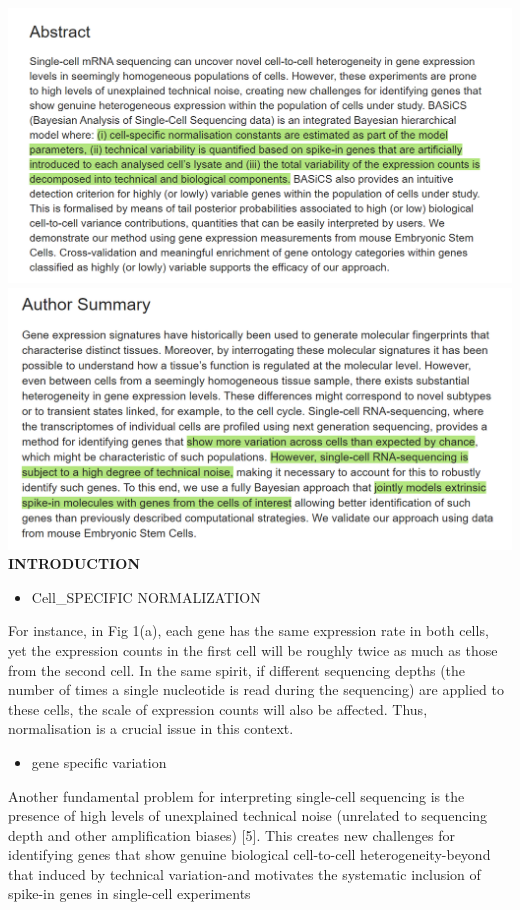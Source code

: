 \documentclass[
]{book}
\providecommand{\tightlist}{%
  \setlength{\itemsep}{0pt}\setlength{\parskip}{0pt}}
\begin{document}
\includegraphics{./figs/RNAseqCounts/BASICS.png}
\includegraphics{./figs/RNAseqCounts/BASICS2.png}
\textbf{INTRODUCTION}

\begin{itemize}
\tightlist
\item
  Cell\_SPECIFIC NORMALIZATION
\end{itemize}

For instance, in Fig 1(a), each gene has the same expression rate in both cells, yet the expression counts in the first cell will be roughly twice as much as those from the second cell. In the same spirit, if different sequencing depths (the number of times a single nucleotide is read during the sequencing) are applied to these cells, the scale of expression counts will also be affected. Thus, normalisation is a crucial issue in this context.

\begin{itemize}
\tightlist
\item
  gene specific variation
\end{itemize}

Another fundamental problem for interpreting single-cell sequencing is the presence of high levels of unexplained technical noise (unrelated to sequencing depth and other amplification biases) {[}5{]}. This creates new challenges for identifying genes that show genuine biological cell-to-cell heterogeneity-beyond that induced by technical variation-and motivates the systematic inclusion of spike-in genes in single-cell experiments
\end{document}
